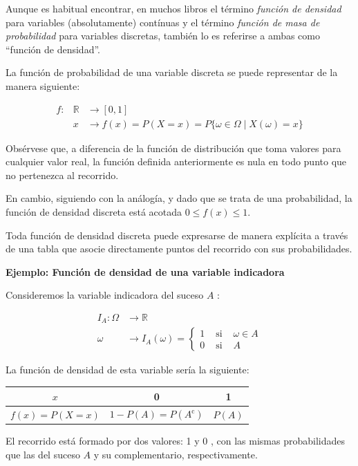\documentclass[
  a4paper,
  DIV=11,
  numbers=noendperiod]{scrreprt}
\begin{document}
Aunque es habitual encontrar, en muchos libros el término \emph{función
de densidad} para variables (absolutamente) contínuas y el término
\emph{función de masa de probabilidad} para variables discretas, también
lo es referirse a ambas como ``función de densidad''.

La función de probabilidad de una variable discreta se puede representar
de la manera siguiente:

\[
\begin{array}{rll}
f: & \mathbb{R} & \rightarrow[0,1] \\
& x & \rightarrow f(x)=P(X=x)=P\{\omega \in \Omega \mid X(\omega)=x\}
\end{array}
\]

Obsérvese que, a diferencia de la función de distribución que toma
valores para cualquier valor real, la función definida anteriormente es
nula en todo punto que no pertenezca al recorrido.

En cambio, siguiendo con la análogía, y dado que se trata de una
probabilidad, la función de densidad discreta está acotada
\(0 \leq f(x) \leq 1\).

Toda función de densidad discreta puede expresarse de manera explícita a
través de una tabla que asocie directamente puntos del recorrido con sus
probabilidades.

\textbf{Ejemplo: Función de densidad de una variable indicadora}

Consideremos la variable indicadora del suceso \(A\) :

\[
\begin{aligned}
I_{A}: \Omega & \rightarrow \mathbb{R} \\
\omega & \rightarrow I_{A}(\omega)=\left\{\begin{array}{lll}
1 & \text { si } & \omega \in A \\
0 & \text { si } & A
\end{array}\right.
\end{aligned}
\]

La función de densidad de esta variable sería la siguiente:

\begin{longtable}[]{@{}ccc@{}}
\toprule\noalign{}
\(x\) & 0 & 1 \\
\midrule\noalign{}
\endhead
\bottomrule\noalign{}
\endlastfoot
\(f(x)=P(X=x)\) & \(1-P(A)=P\left(A^{\mathrm{c}}\right)\) & \(P(A)\) \\
\end{longtable}

El recorrido está formado por dos valores: 1 y 0 , con las mismas
probabilidades que las del suceso \(A\) y su complementario,
respectivamente.
\end{document}
